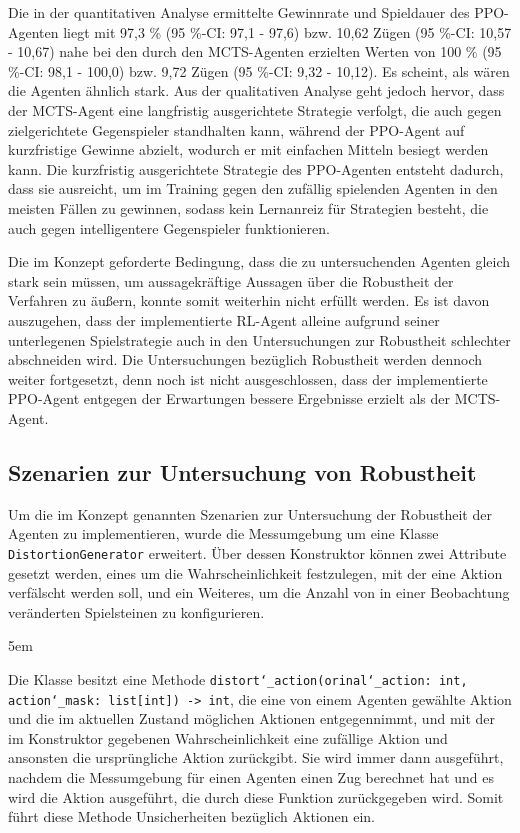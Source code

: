 Die in der quantitativen Analyse ermittelte Gewinnrate und Spieldauer des PPO-Agenten liegt mit 97,3 \% (95 \%-CI: 97,1 - 97,6) bzw. 10,62 Zügen (95 \%-CI: 10,57 - 10,67) nahe bei den durch den MCTS-Agenten erzielten Werten von 100 \% (95 \%-CI: 98,1 - 100,0) bzw. 9,72 Zügen (95 \%-CI: 9,32 - 10,12). Es scheint, als wären die Agenten ähnlich stark. Aus der qualitativen Analyse geht jedoch hervor, dass der MCTS-Agent eine langfristig ausgerichtete Strategie verfolgt, die auch gegen zielgerichtete Gegenspieler standhalten kann, während der PPO-Agent auf kurzfristige Gewinne abzielt, wodurch er mit einfachen Mitteln besiegt werden kann. Die kurzfristig ausgerichtete Strategie des PPO-Agenten entsteht dadurch, dass sie ausreicht, um im Training gegen den zufällig spielenden Agenten in den meisten Fällen zu gewinnen, sodass kein Lernanreiz für Strategien besteht, die auch gegen intelligentere Gegenspieler funktionieren.

Die im Konzept geforderte Bedingung, dass die zu untersuchenden Agenten gleich stark sein müssen, um aussagekräftige Aussagen über die Robustheit der Verfahren zu äußern, konnte somit weiterhin nicht erfüllt werden. Es ist davon auszugehen, dass der implementierte RL-Agent alleine aufgrund seiner unterlegenen Spielstrategie auch in den Untersuchungen zur Robustheit schlechter abschneiden wird. Die Untersuchungen bezüglich Robustheit werden dennoch weiter fortgesetzt, denn noch ist nicht ausgeschlossen, dass der implementierte PPO-Agent entgegen der Erwartungen bessere Ergebnisse erzielt als der MCTS-Agent.

\subsection{Szenarien zur Untersuchung von Robustheit}

\label{robustheit-szenarien}

Um die im Konzept genannten Szenarien zur Untersuchung der Robustheit der Agenten zu implementieren, wurde die Messumgebung um eine Klasse \texttt{DistortionGenerator} erweitert. Über dessen Konstruktor können zwei Attribute gesetzt werden, eines um die Wahrscheinlichkeit festzulegen, mit der eine Aktion verfälscht werden soll, und ein Weiteres, um die Anzahl von in einer Beobachtung veränderten Spielsteinen zu konfigurieren.

\begingroup

\emergencystretch 5em%

	 Die Klasse besitzt eine Methode \texttt{distort\char`_action(orinal\char`_action: int, action\char`_mask: list[int]) -> int}, die eine von einem Agenten gewählte Aktion und die im aktuellen Zustand möglichen Aktionen entgegennimmt, und mit der im Konstruktor gegebenen Wahrscheinlichkeit eine zufällige Aktion und ansonsten die ursprüngliche Aktion zurückgibt. Sie wird immer dann ausgeführt, nachdem die Messumgebung für einen Agenten einen Zug berechnet hat und es wird die Aktion ausgeführt, die durch diese Funktion zurückgegeben wird. Somit führt diese Methode Unsicherheiten bezüglich Aktionen ein.

